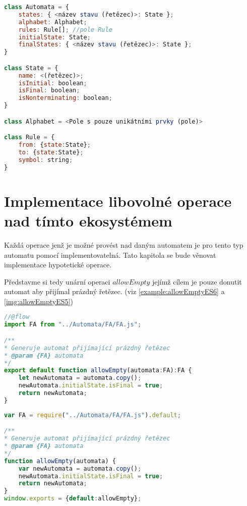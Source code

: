 

\begin{lstlisting}[language=JavaScript,label={example:hierarchy}, caption={Třídní hierarchie implementace}]
class Automata = {
    states: { <název stavu (řetězec)>: State };
    alphabet: Alphabet;
    rules: Rule[]; //pole Rule
    initialState: State;
    finalStates: { <název stavu (řetězec)>: State };
}

class State = {
    name: <(řetězec)>;
    isInitial: boolean;
    isFinal: boolean;
    isNonterminating: boolean;
}

class Alphabet = <Pole s pouze unikátními prvky (pole)>

class Rule = {
    from: {state:State};
    to: {state:State};
    symbol: string;
}

\end{lstlisting}



\section{Implementace libovolné operace nad tímto ekosystémem}
Každá operace jenž je možné provést nad daným automatem je pro tento typ automatu pomocí implementovatelná.
Tato kapitola se bude věnovat implementace hypotetické operace.

Představme si tedy unární operaci $allowEmpty$ jejímž cílem je pouze donutit automat aby přijímal prázdný řetězec.
(viz \ref{example:allowEmptyES6} a \ref{img:allowEmptyES5})


\begin{lstlisting}[language=JavaScript,label={example:allowEmptyES6}, caption={Ukázka implementace operace za použití EcmaScript 2015 a Flow}]
//@flow
import FA from "../Automata/FA/FA.js";

/**
* Generuje automat přijímající prázdný řetězec
* @param {FA} automata
*/
export default function allowEmpty(automata:FA):FA {
	let newAutomata = automata.copy();
	newAutomata.initialState.isFinal = true;
	return newAutomata;
}
\end{lstlisting}

\begin{lstlisting}[language=JavaScript,label={img:allowEmptyES5}, caption={Ukázka implementace operace pomocí standardního JavaScriptu}]
var FA = require("../Automata/FA/FA.js").default;

/**
* Generuje automat přijímající prázdný řetězec
* @param {FA} automata
*/
function allowEmpty(automata) {
	var newAutomata = automata.copy();
	newAutomata.initialState.isFinal = true;
	return newAutomata;
}
window.exports = {default:allowEmpty};
\end{lstlisting}



